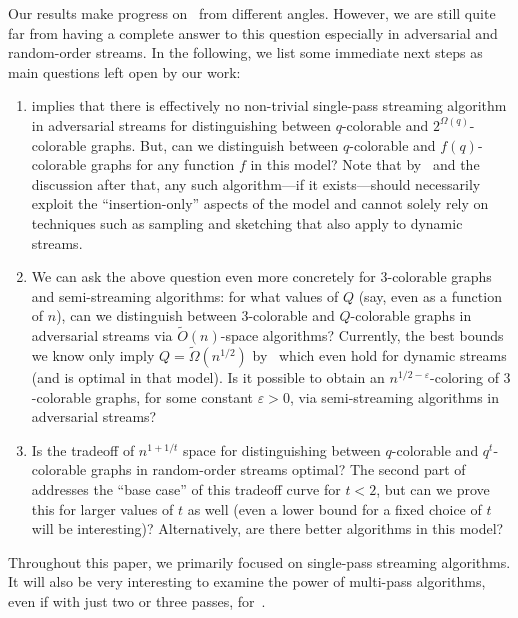 \documentclass[11pt]{article}
\theoremstyle{definition}
\newcommand{\Ot}{\ensuremath{\widetilde{O}}}
\newcommand{\eps}{\ensuremath{\varepsilon}}
\newcommand{\Omgt}{\ensuremath{\widetilde{\Omega}}}
\begin{document}
Our results make progress on~ from different angles. However, we are still quite far from having a complete answer to this question especially in adversarial and random-order streams. 
In the following, we list some immediate next steps as main questions 
left open by our work: 
\begin{enumerate}
	\item {} implies that there is effectively no non-trivial single-pass streaming algorithm in adversarial streams for distinguishing between $q$-colorable and $2^{\Omega(q)}$-colorable graphs. 
	But, can we distinguish between $q$-colorable and $f(q)$-colorable graphs for any function $f$ in this model? Note that by~ and the discussion after that, any such algorithm---if it exists---should necessarily
	exploit the ``insertion-only'' aspects of the model and cannot solely rely on techniques such as sampling and sketching that also apply to dynamic streams. 
	
	\item We can ask the above question even more concretely for $3$-colorable graphs and semi-streaming algorithms: 
	for what values of $Q$ (say, even as a function of $n$), can we distinguish between $3$-colorable and $Q$-colorable graphs in adversarial streams via $\Ot(n)$-space algorithms? Currently, the best bounds 
	we know only imply $Q = \Omgt(n^{1/2})$ by~ which even hold for dynamic streams (and is optimal in that model). Is it possible to obtain an $n^{1/2-\eps}$-coloring of $3$-colorable graphs, for some constant $\eps > 0$, via 
	semi-streaming algorithms in adversarial streams? 
	
	\item Is the tradeoff of $n^{1+1/t}$ space for distinguishing between $q$-colorable and $q^t$-colorable graphs in random-order streams optimal? The second part of~ addresses the ``base case'' of this tradeoff curve
	for $t < 2$, but can we prove this for larger values of $t$ as well (even a lower bound for a fixed choice of $t$ will be interesting)? Alternatively, are there better algorithms in this model? 
\end{enumerate}

Throughout this paper, we primarily focused on single-pass streaming algorithms. It will also be very interesting to examine the power of multi-pass algorithms, even if with just two or three passes, for~. 
\end{document}
